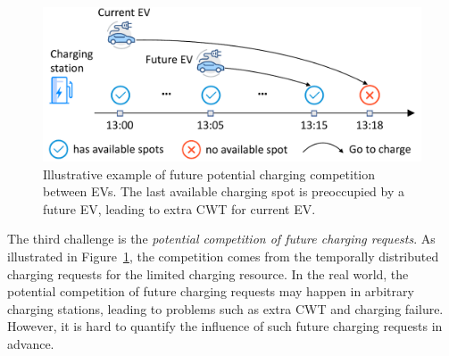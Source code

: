 \documentclass[sigconf]{acmart}
\newcommand{\hao}[1]{{\color{black}{#1}}}
\newcommand{\jia}[1]{{\color{black}{#1}}}
\newcommand\beftext[1]{{\color[rgb]{0.5,0.5,0.5}{BEFORE:#1}}}
\newcommand\figref[1]{Figure~\ref{#1}}
\begin{document}
\begin{figure}[tb]
	\centering
	\includegraphics[width=0.95\columnwidth]{figs/_competition.pdf}
	\caption{Illustrative example of future potential charging competition between EVs. The last available charging spot is preoccupied by a future EV, leading to extra CWT for current EV.}
	\label{fig:tmp_example}
\end{figure}
The third challenge is the \emph{potential competition of future charging requests}.
As illustrated in \figref{fig:tmp_example}, the competition comes from the temporally distributed charging requests for the limited charging resource.
In the real world, the potential competition of future charging requests may happen in arbitrary charging stations, leading to problems such as extra CWT and charging failure.
However, it is hard to quantify the influence of such future charging requests in advance.
\hao{To this end, we integrate the future charging competition information into centralized attentive critic module through a delayed access strategy and transform our framework to a centralized training with decentralized execution architecture to enable online recommendation. In this way, the agents can fully harness future knowledge in training phase and take actions immediately without requiring future information during execution.}


\end{document}
